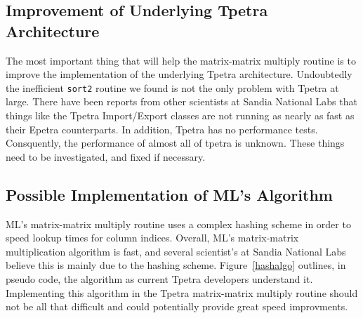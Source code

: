 \documentclass[pdf,12pt]{SANDreport}
\begin{document}
\subsection{Improvement of Underlying Tpetra Architecture}
The most important thing that will help the matrix-matrix multiply routine is to improve the implementation of the
underlying Tpetra architecture. 
Undoubtedly the inefficient \verb!sort2! routine we found is not the only problem with Tpetra at large. There have been 
reports from other scientists at Sandia National Labs that things like the Tpetra Import/Export classes are not running as 
nearly as fast as their Epetra counterparts. In addition, Tpetra has no performance tests. Consquently, the performance of 
almost all of tpetra is unknown. These things need to be investigated, and fixed if necessary.

\subsection{Possible Implementation of ML's Algorithm}
ML's matrix-matrix multiply routine uses a complex hashing scheme in order to speed lookup times for 
column indices. Overall, ML's matrix-matrix multiplication algorithm is fast, and several scientist's at Sandia National 
Labs believe this is mainly due to the hashing scheme. Figure~\ref{hashalgo} outlines, in pseudo code, the 
algorithm as current Tpetra developers understand it. Implementing this algorithm in the Tpetra matrix-matrix multiply 
routine should not be all that difficult and could potentially provide great speed improvments.
\end{document}
